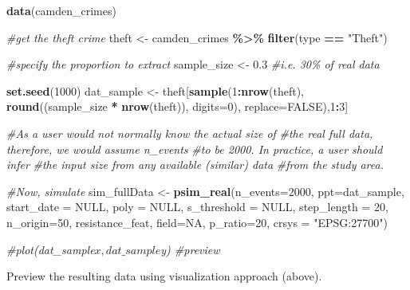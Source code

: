 \documentclass[
  16pt,
]{article}
\newenvironment{Shaded}{\begin{snugshade}}{\end{snugshade}}
\newcommand{\CommentTok}[1]{\textcolor[rgb]{0.56,0.35,0.01}{\textit{#1}}}
\newcommand{\DataTypeTok}[1]{\textcolor[rgb]{0.13,0.29,0.53}{#1}}
\newcommand{\DecValTok}[1]{\textcolor[rgb]{0.00,0.00,0.81}{#1}}
\newcommand{\FloatTok}[1]{\textcolor[rgb]{0.00,0.00,0.81}{#1}}
\newcommand{\KeywordTok}[1]{\textcolor[rgb]{0.13,0.29,0.53}{\textbf{#1}}}
\newcommand{\NormalTok}[1]{#1}
\newcommand{\OperatorTok}[1]{\textcolor[rgb]{0.81,0.36,0.00}{\textbf{#1}}}
\newcommand{\OtherTok}[1]{\textcolor[rgb]{0.56,0.35,0.01}{#1}}
\newcommand{\StringTok}[1]{\textcolor[rgb]{0.31,0.60,0.02}{#1}}
\begin{document}
\begin{Shaded}
\begin{Highlighting}[]
\KeywordTok{data}\NormalTok{(camden\_crimes)}

\CommentTok{\#get the \textquotesingle{}theft\textquotesingle{} crime}
\NormalTok{theft <{-}}\StringTok{ }\NormalTok{camden\_crimes }\OperatorTok{\%>\%}
\StringTok{  }\KeywordTok{filter}\NormalTok{(type }\OperatorTok{==}\StringTok{ "Theft"}\NormalTok{)}

\CommentTok{\#specify the proportion to extract}
\NormalTok{sample\_size <{-}}\StringTok{ }\FloatTok{0.3} \CommentTok{\#i.e. 30\% of real data}

\KeywordTok{set.seed}\NormalTok{(}\DecValTok{1000}\NormalTok{)}
\NormalTok{dat\_sample <{-}}\StringTok{ }\NormalTok{theft[}\KeywordTok{sample}\NormalTok{(}\DecValTok{1}\OperatorTok{:}\KeywordTok{nrow}\NormalTok{(theft),}
  \KeywordTok{round}\NormalTok{((sample\_size }\OperatorTok{*}\StringTok{ }\KeywordTok{nrow}\NormalTok{(theft)), }\DataTypeTok{digits=}\DecValTok{0}\NormalTok{),}
  \DataTypeTok{replace=}\OtherTok{FALSE}\NormalTok{),}\DecValTok{1}\OperatorTok{:}\DecValTok{3}\NormalTok{]}

\CommentTok{\#As a user would not normally know the actual size of }
\CommentTok{\#the real full data, therefore, we would assume \textasciigrave{}n\_events\textasciigrave{}}
\CommentTok{\#to be \textasciigrave{}2000\textasciigrave{}. In practice, a user should infer }
\CommentTok{\#the input size from any available (similar) data }
\CommentTok{\#from the study area.}

\CommentTok{\#Now, simulate}
\NormalTok{sim\_fullData <{-}}\StringTok{ }\KeywordTok{psim\_real}\NormalTok{(}\DataTypeTok{n\_events=}\DecValTok{2000}\NormalTok{, }\DataTypeTok{ppt=}\NormalTok{dat\_sample,}
  \DataTypeTok{start\_date =} \OtherTok{NULL}\NormalTok{, }\DataTypeTok{poly =} \OtherTok{NULL}\NormalTok{, }\DataTypeTok{s\_threshold =} \OtherTok{NULL}\NormalTok{,}
  \DataTypeTok{step\_length =} \DecValTok{20}\NormalTok{, }\DataTypeTok{n\_origin=}\DecValTok{50}\NormalTok{, resistance\_feat, }\DataTypeTok{field=}\OtherTok{NA}\NormalTok{,}
  \DataTypeTok{p\_ratio=}\DecValTok{20}\NormalTok{, }\DataTypeTok{crsys =} \StringTok{"EPSG:27700"}\NormalTok{)}

\CommentTok{\#plot(dat\_sample$x, dat\_sample$y) \#preview}
\end{Highlighting}
\end{Shaded}

Preview the resulting data using visualization approach (above).
\end{document}
